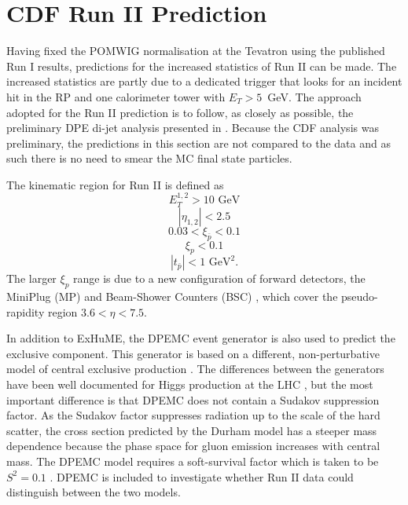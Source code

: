 \section{CDF Run II Prediction}\label{cdfrun2}

Having fixed the POMWIG normalisation at the Tevatron using the published Run I results, predictions for the increased statistics of Run II can be made. The increased statistics are partly due to a dedicated trigger that looks for an incident hit in the RP and one calorimeter tower with $E_T>5$~GeV. The approach adopted for the Run II prediction is to follow, as closely as possible, the preliminary DPE di-jet analysis presented in \cite{Gallinaro:2005qh,Gallinaro:2005uh}. Because the CDF analysis was preliminary, the predictions in this section are not compared to the data and as such there is no need to smear the MC final state particles.

The kinematic region for Run II is defined \cite{Gallinaro:2005qh} as
\begin{equation}
E_T^{1,2} > 10\text{ GeV}
\end{equation}
\begin{equation}
|\eta_{1,2}| < 2.5
\end{equation}
\begin{equation}
0.03 < \xi_{\bar{p}} < 0.1
\end{equation}
\begin{equation}
\xi_p < 0.1
\end{equation}
\begin{equation}
|t_{\bar{p}}| < 1 \text{ GeV}^2.
\end{equation}
The larger $\xi_p$ range is due to a new configuration of forward detectors, the MiniPlug (MP) and Beam-Shower Counters (BSC) \cite{Gallinaro:2004nd}, which cover the pseudo-rapidity region $3.6 < \eta < 7.5$. 

In addition to ExHuME, the DPEMC event generator \cite{Boonekamp:2003ie} is also used to predict the exclusive component. This generator is based on a different, non-perturbative model of central exclusive production \cite{Bialas:1991wj,Forshaw:2005qp}. The differences between the generators have been well documented for Higgs production at the LHC  \cite{Alekhin:2005dy:excMC}, but the most important difference is that DPEMC does not contain a Sudakov suppression factor. As the Sudakov factor suppresses radiation up to the scale of the hard scatter, the cross section predicted by the Durham model has a steeper mass dependence because the phase space for gluon emission increases with central mass. The DPEMC model requires a soft-survival factor which is taken to be $S^2 = 0.1$ \cite{maartenboonekamp}. DPEMC is included to investigate whether Run II data could distinguish between the two models.

